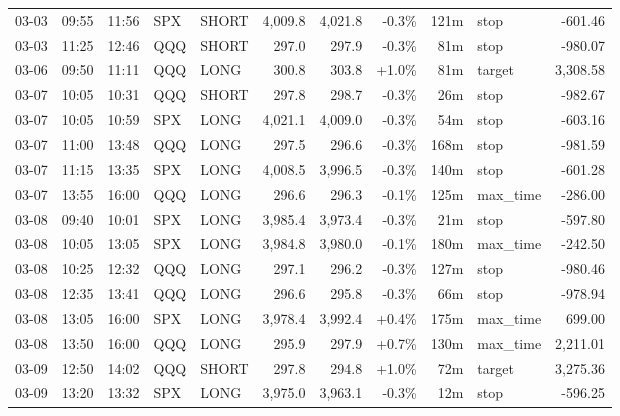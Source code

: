\documentclass[11pt,a4paper,twoside]{article}
\begin{document}
\begin{center}
\begin{longtable}{>{\color{txtmain}}l l l l l r r r r >{\color{txtmain}}l r}
03-03 & 09:55 & 11:56 & SPX & SHORT & 4,009.8 & 4,021.8 & \textcolor{lossred}{-0.3\%} & 121m & stop & \textcolor{lossred}{-601.46} \\
03-03 & 11:25 & 12:46 & QQQ & SHORT & 297.0 & 297.9 & \textcolor{lossred}{-0.3\%} & 81m & stop & \textcolor{lossred}{-980.07} \\
03-06 & 09:50 & 11:11 & QQQ & LONG & 300.8 & 303.8 & \textcolor{wingreen}{+1.0\%} & 81m & target & \textcolor{wingreen}{3,308.58} \\
03-07 & 10:05 & 10:31 & QQQ & SHORT & 297.8 & 298.7 & \textcolor{lossred}{-0.3\%} & 26m & stop & \textcolor{lossred}{-982.67} \\
03-07 & 10:05 & 10:59 & SPX & LONG & 4,021.1 & 4,009.0 & \textcolor{lossred}{-0.3\%} & 54m & stop & \textcolor{lossred}{-603.16} \\
03-07 & 11:00 & 13:48 & QQQ & LONG & 297.5 & 296.6 & \textcolor{lossred}{-0.3\%} & 168m & stop & \textcolor{lossred}{-981.59} \\
03-07 & 11:15 & 13:35 & SPX & LONG & 4,008.5 & 3,996.5 & \textcolor{lossred}{-0.3\%} & 140m & stop & \textcolor{lossred}{-601.28} \\
03-07 & 13:55 & 16:00 & QQQ & LONG & 296.6 & 296.3 & \textcolor{lossred}{-0.1\%} & 125m & max\_time & \textcolor{lossred}{-286.00} \\
03-08 & 09:40 & 10:01 & SPX & LONG & 3,985.4 & 3,973.4 & \textcolor{lossred}{-0.3\%} & 21m & stop & \textcolor{lossred}{-597.80} \\
03-08 & 10:05 & 13:05 & SPX & LONG & 3,984.8 & 3,980.0 & \textcolor{lossred}{-0.1\%} & 180m & max\_time & \textcolor{lossred}{-242.50} \\
03-08 & 10:25 & 12:32 & QQQ & LONG & 297.1 & 296.2 & \textcolor{lossred}{-0.3\%} & 127m & stop & \textcolor{lossred}{-980.46} \\
03-08 & 12:35 & 13:41 & QQQ & LONG & 296.6 & 295.8 & \textcolor{lossred}{-0.3\%} & 66m & stop & \textcolor{lossred}{-978.94} \\
03-08 & 13:05 & 16:00 & SPX & LONG & 3,978.4 & 3,992.4 & \textcolor{wingreen}{+0.4\%} & 175m & max\_time & \textcolor{wingreen}{699.00} \\
03-08 & 13:50 & 16:00 & QQQ & LONG & 295.9 & 297.9 & \textcolor{wingreen}{+0.7\%} & 130m & max\_time & \textcolor{wingreen}{2,211.01} \\
03-09 & 12:50 & 14:02 & QQQ & SHORT & 297.8 & 294.8 & \textcolor{wingreen}{+1.0\%} & 72m & target & \textcolor{wingreen}{3,275.36} \\
03-09 & 13:20 & 13:32 & SPX & LONG & 3,975.0 & 3,963.1 & \textcolor{lossred}{-0.3\%} & 12m & stop & \textcolor{lossred}{-596.25} \\

\end{longtable}
\end{center}
\end{document}
